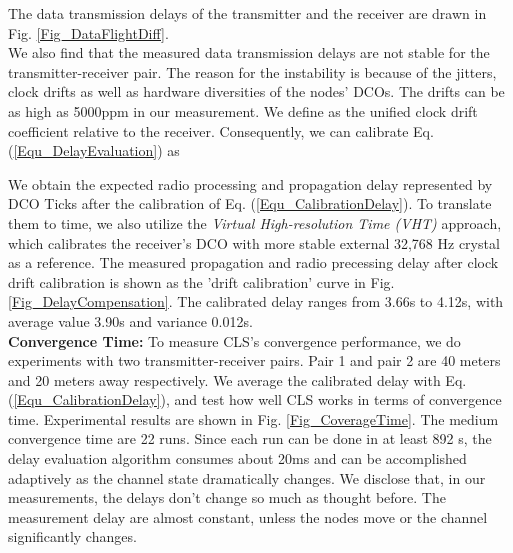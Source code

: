 \documentclass[conference]{IEEEtran}
\begin{document}
The data transmission delays of the transmitter and the receiver are drawn in Fig. \ref{Fig_DataFlightDiff}.\\
\indent We also find that the measured data transmission delays are not stable for the transmitter-receiver pair.
The reason for the instability is because of the jitters, clock drifts as well as hardware diversities of the nodes' DCOs. The drifts can be as high as 5000ppm in our measurement.
We define  as the unified clock drift coefficient relative to the receiver.
Consequently, we can calibrate Eq. (\ref{Equ_DelayEvaluation}) as

We obtain the expected radio processing and propagation delay represented by DCO Ticks after the calibration of Eq. (\ref{Equ_CalibrationDelay}).
To translate them to time, we also utilize the \emph{Virtual High-resolution Time (VHT)} \cite{SchmidIPSN10} approach, which calibrates the receiver's DCO with more stable external 32,768 Hz crystal as a reference.
The measured propagation and radio precessing delay after clock drift calibration is shown as the 'drift calibration' curve in Fig. \ref{Fig_DelayCompensation}.
The calibrated delay ranges from 3.66s to 4.12s, with average value 3.90s and variance 0.012s.\\
\indent \textbf{Convergence Time:} To measure CLS's convergence performance, we do experiments with two transmitter-receiver pairs.
Pair 1 and pair 2 are 40 meters and 20 meters away respectively.
We average the calibrated delay with Eq. (\ref{Equ_CalibrationDelay}), and test how well CLS works in terms of convergence time.
Experimental results are shown in Fig. \ref{Fig_CoverageTime}.
The medium convergence time are 22 runs.
Since each run can be done in at least 892 s, the delay evaluation algorithm consumes about 20ms and can be accomplished adaptively as the channel state dramatically changes.
We disclose that, in our measurements, the delays don't change so much as thought before.
The measurement delay are almost constant, unless the nodes move or the channel significantly changes.
\end{document}
